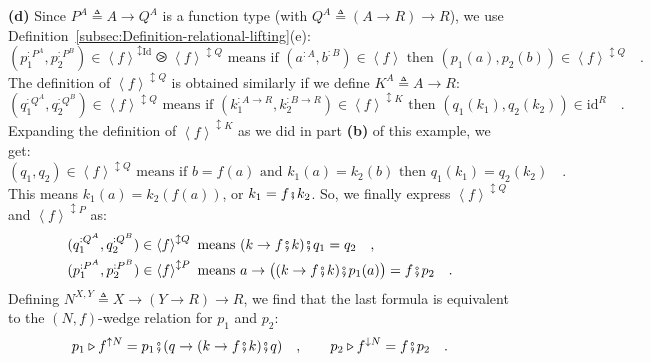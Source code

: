 \textbf{(d)} Since $P^{A}\triangleq A\rightarrow Q^{A}$ is a function
type (with $Q^{A}\triangleq\left(A\rightarrow R\right)\rightarrow R$),
we use Definition~\ref{subsec:Definition-relational-lifting}(e):
\[
(p_{1}^{:P^{A}},p_{2}^{:P^{B}})\in\left<f\right>^{\updownarrow\text{Id}}\ogreaterthan\left<f\right>^{\updownarrow Q}\text{ means if }(a^{:A},b^{:B})\in\left<f\right>\text{ then }(p_{1}(a),p_{2}(b))\in\left<f\right>^{\updownarrow Q}\quad.
\]
The definition of $\left<f\right>^{\updownarrow Q}$ is obtained similarly
if we define $K^{A}\triangleq A\rightarrow R$:
\[
(q_{1}^{:Q^{A}},q_{2}^{:Q^{B}})\in\left<f\right>^{\updownarrow Q}\text{ means if }(k_{1}^{:A\rightarrow R},k_{2}^{:B\rightarrow R})\in\left<f\right>^{\updownarrow K}\text{ then }(q_{1}(k_{1}),q_{2}(k_{2}))\in\text{id}^{R}\quad.
\]
Expanding the definition of $\left<f\right>^{\updownarrow K}$ as
we did in part \textbf{(b)} of this example, we get:
\[
(q_{1},q_{2})\in\left<f\right>^{\updownarrow Q}\text{ means if }b=f(a)\text{ and }k_{1}(a)=k_{2}(b)\text{ then }q_{1}(k_{1})=q_{2}(k_{2})\quad.
\]
This means $k_{1}(a)=k_{2}(f(a))$, or $k_{1}=f\bef k_{2}$. So, we
finally express $\left<f\right>^{\updownarrow Q}$ and $\left<f\right>^{\updownarrow P}$
as:
\begin{align*}
 & (q_{1}^{:Q^{A}},q_{2}^{:Q^{B}})\in\left<f\right>^{\updownarrow Q}\text{ means }(k\rightarrow f\bef k)\bef q_{1}=q_{2}\quad,\\
 & (p_{1}^{:P^{A}},p_{2}^{:P^{B}})\in\left<f\right>^{\updownarrow P}\text{ means }a\rightarrow\big((k\rightarrow f\bef k)\bef p_{1}(a)\big)=f\bef p_{2}\quad.
\end{align*}
Defining $N^{X,Y}\triangleq X\rightarrow\left(Y\rightarrow R\right)\rightarrow R$,
we find that the last formula is equivalent to the $\left(N,f\right)$-wedge
relation for $p_{1}$ and $p_{2}$:
\[
p_{1}\triangleright f^{\uparrow N}=p_{1}\bef(q\rightarrow(k\rightarrow f\bef k)\bef q)\quad,\quad\quad p_{2}\triangleright f^{\downarrow N}=f\bef p_{2}\quad.
\]

